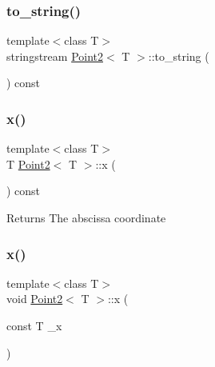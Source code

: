 \mbox{\label{class_point2_aa04082290a2f554060081beafd7d7e0d}} 
\subsubsection{\texorpdfstring{to\_string()}{to\_string()}}
{\footnotesize\ttfamily template$<$class T$>$ \\
stringstream \mbox{\hyperlink{class_point2}{Point2}}$<$ T $>$\+::to\+\_\+string (\begin{DoxyParamCaption}{ }\end{DoxyParamCaption}) const\hspace{0.3cm}{\ttfamily [inline]}}

\mbox{\label{class_point2_adbf149d6f50de0d91c714a3fc45a80c5}} 
\subsubsection{\texorpdfstring{x()}{x()}\hspace{0.1cm}{\footnotesize\ttfamily [1/2]}}
{\footnotesize\ttfamily template$<$class T$>$ \\
T \mbox{\hyperlink{class_point2}{Point2}}$<$ T $>$\+::x (\begin{DoxyParamCaption}{ }\end{DoxyParamCaption}) const\hspace{0.3cm}{\ttfamily [inline]}}

\begin{DoxyReturn}{Returns}
The abscissa coordinate 
\end{DoxyReturn}
\mbox{\label{class_point2_a0693b1a0d34cb1dd3a4d30ea078a4d5e}} 
\subsubsection{\texorpdfstring{x()}{x()}\hspace{0.1cm}{\footnotesize\ttfamily [2/2]}}
{\footnotesize\ttfamily template$<$class T$>$ \\
void \mbox{\hyperlink{class_point2}{Point2}}$<$ T $>$\+::x (\begin{DoxyParamCaption}\item[{const T}]{\+\_\+x }\end{DoxyParamCaption})\hspace{0.3cm}{\ttfamily [inline]}}



